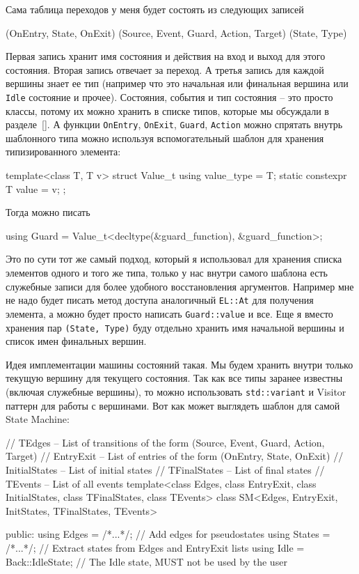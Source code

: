 \documentclass{article}
\begin{document}
{Сама таблица переходов у меня будет состоять из следующих записей
\begin{cppcode}[\nonumbers]
(OnEntry, State, OnExit)
(Source, Event, Guard, Action, Target)
(State, Type)
\end{cppcode}
Первая запись хранит имя состояния и действия на вход и выход для этого состояния.
Вторая запись отвечает за переход.
А третья запись для каждой вершины знает ее тип (например что это начальная или финальная вершина или \verb"Idle" состояние и прочее).
Состояния, события и тип состояния -- это просто классы, потому их можно хранить в списке типов, которые мы обсуждали в разделе~\ref{}.
А функции \verb"OnEntry", \verb"OnExit", \verb"Guard", \verb"Action" можно спрятать внутрь шаблонного типа можно используя вспомогательный шаблон для хранения типизированного элемента:
\begin{cppcode}[\nonumbers]
template<class T, T v>
struct Value_t {
  using value_type = T;
  static constexpr T value = v;
};
\end{cppcode}
Тогда можно писать
\begin{cppcode}[\nonumbers]
using Guard = Value_t<decltype(&guard_function), &guard_function>;
\end{cppcode}
Это по сути тот же самый подход, который я использовал для хранения списка элементов одного и того же типа, только у нас внутри самого шаблона есть служебные записи для более удобного восстановления аргументов.
Например мне не надо будет писать метод доступа аналогичный \verb"EL::At" для получения элемента, а можно будет просто написать \verb"Guard::value" и все.
Еще я вместо хранения пар \verb"(State, Type)" буду отдельно хранить имя начальной вершины и список имен финальных вершин.

Идея имплементации машины состояний такая.
Мы будем хранить внутри только текущую вершину для текущего состояния.
Так как все типы заранее известны (включая служебные вершины), то можно использовать \verb"std::variant" и Visitor паттерн для работы с вершинами.
Вот как может выглядеть шаблон для самой State Machine:
\begin{cppcode}
// TEdges        -- List of transitions of the form (Source, Event, Guard, Action, Target)
// EntryExit     -- List of entries of the form (OnEntry, State, OnExit)
// InitialStates -- List of initial states
// TFinalStates  -- List of final states
// TEvents       -- List of all events
template<class Edges, class EntryExit, class InitialStates, class TFinalStates, class TEvents>
class SM<Edges, EntryExit, InitStates, TFinalStates, TEvents> {
public:
  using Edges = /*...*/;        // Add edges for pseudostates
  using States =  /*...*/;      // Extract states from Edges and EntryExit lists
  using Idle = Back::IdleState; // The Idle state, MUST not be used by the user

}
\end{cppcode}}
\end{document}
